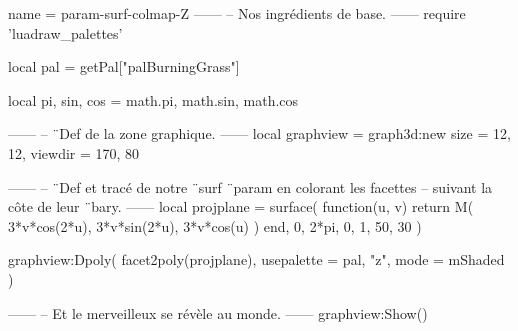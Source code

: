 \documentclass{standalone}
\begin{document}
\begin{luadraw}{name = param-surf-colmap-Z}
------
-- Nos ingrédients de base.
------
require 'luadraw_palettes'

local pal = getPal["palBurningGrass"]

local pi, sin, cos = math.pi, math.sin, math.cos

------
-- ¨Def de la zone graphique.
------
local graphview = graph3d:new{
  size    = {12, 12},
  viewdir = {170, 80}
}

------
-- ¨Def et tracé de notre ¨surf ¨param en colorant les facettes
-- suivant la côte de leur ¨bary.
------
local projplane = surface(
  function(u, v)
    return M(
      3*v*cos(2*u),
      3*v*sin(2*u),
      3*v*cos(u)
    )
  end,
  0, 2*pi, 0, 1,
  {50, 30}
)

graphview:Dpoly(
  facet2poly(projplane), 
  {
    usepalette = {pal, "z"},
    mode       = mShaded
  }
)

------
-- Et le merveilleux se révèle au monde.
------
graphview:Show()
\end{luadraw}
\end{document}
